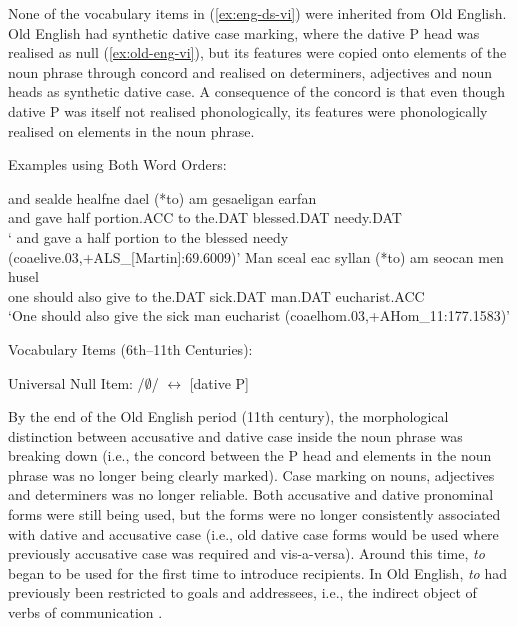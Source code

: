 	None of the vocabulary items in (\ref{ex:eng-ds-vi}) were inherited from Old English. Old English had synthetic dative case marking, where the dative P head was realised as null (\ref{ex:old-eng-vi}), but its features were copied onto elements of the noun phrase through concord and realised on determiners, adjectives and noun heads as synthetic dative case. A consequence of the concord is that even though dative P was itself not realised phonologically, its features were phonologically realised on elements in the noun phrase. 
	\begin{exe}
		\ex Examples using Both Word Orders:
		\begin{xlist}
			\ex \gll and sealde healfne dael (*to) \TH am gesaeligan \TH earfan\\
			and gave half portion.ACC to the.DAT blessed.DAT needy.DAT\\
			\trans ` and gave a half portion to the blessed needy (coaelive.03,+ALS\_[Martin]:69.6009)'
			\ex \gll Man sceal eac syllan (*to) \TH am seocan men husel\\
			one should also give to the.DAT sick.DAT man.DAT eucharist.ACC\\
			\trans `One should also give the sick man eucharist (coaelhom.03,+AHom\_11:177.1583)'
		\end{xlist}
		\ex Vocabulary Items (6th--11th Centuries):\label{ex:old-eng-vi}
		\begin{xlist}
			\ex Universal Null Item:  /$\emptyset$/ $\leftrightarrow$ [dative P]
		\end{xlist}
	\end{exe}
	
	By the end of the Old English period (11th century), the morphological distinction between accusative and dative case inside the noun phrase was breaking down (i.e., the concord between the P head and elements in the noun phrase was no longer being clearly marked). Case marking on nouns, adjectives and determiners was no longer reliable. Both accusative and dative pronominal forms were still being used, but the forms were no longer consistently associated with dative and accusative case (i.e., old dative case forms would be used where previously accusative case was required and vis-a-versa). Around this time, \textit{to} began to be used for the first time to introduce recipients. In Old English, \textit{to} had previously been restricted to goals and addressees, i.e., the indirect object of verbs of communication \citep{Allen.1999,McFadden.2002,OED.2013}. 
	
